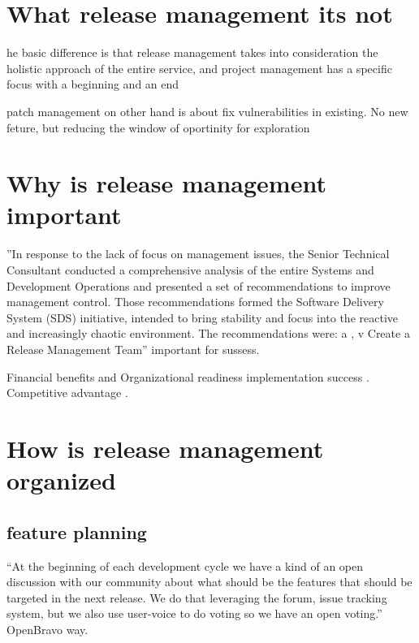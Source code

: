  \section{What release management its not} 
 
 he basic difference is that release management takes into consideration the holistic
approach of the entire service, and project management has a specific focus with a
beginning and an end \citep{Howard2016} 

patch management on other hand is about fix vulnerabilities in existing. No new feture, but reducing the window of oportinity for exploration 

\citep{CavusogluCavusoglu_et_al2008}


  \section{Why is release management important}
  
  

  
  
  ''In response to the lack of focus on management issues, the Senior Technical Consultant conducted a comprehensive analysis of the entire Systems and Development Operations and presented a set of recommendations to improve management control. Those recommendations formed the Software Delivery System (SDS) initiative, intended to bring stability and focus into the reactive and increasingly chaotic environment.
The recommendations were: a , v 
    Create a Release Management Team''   \citep{CustodioThorogood_et_al2006} important for sussess. 
    
    Financial benefits and Organizational readiness  \citep{Howard2016}
    implementation success \citep{TammSeddon_et_al2015}.
    Competitive advantage \citep{IravaniDasu_et_al2012}.
    


    
 
 \section{How is release management organized} 
 
 
 \subsection{feature planning}
 
 
 	“At the beginning of each development cycle we have a kind of an open discussion with our community about what should be the features that should be targeted in the next release. We do that leveraging the forum, issue tracking system, but we also use user-voice to do voting so we have an open voting.” \citep{DeodharSaxena_et_al2012} OpenBravo way.
 	
